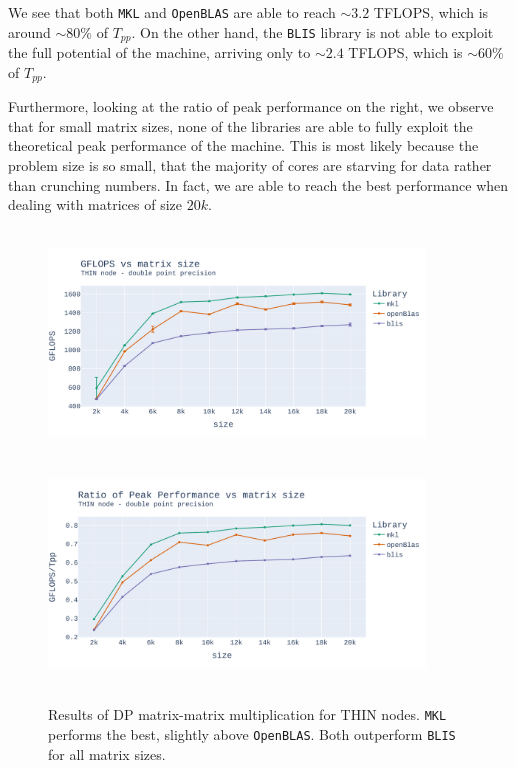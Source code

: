 \documentclass{report}
\begin{document}
We see that both \texttt{MKL} and \texttt{OpenBLAS} are able to reach $\sim 3.2$ 
TFLOPS, which is around $\sim80\%$ of $T_{pp}$. On the other hand, the \texttt{BLIS}
library is not able to exploit the full potential of the machine, arriving only
to $\sim 2.4$ TFLOPS, which is $\sim60\%$ of $T_{pp}$.

Furthermore, looking at the ratio of peak performance on the right, we observe 
that for small matrix sizes, none of the libraries are able to fully exploit 
the theoretical peak performance of the machine. This is most likely because the 
problem size is so small, that the majority of cores are starving for data rather 
than crunching numbers. In fact, we are able to reach the best performance when 
dealing with matrices of size $20k$. 

\begin{figure}[H]
\hspace*{-2.5cm}
\includegraphics[width=10cm, height=6cm]{./images/fixed_cores_thin_double_gflops.pdf}
\includegraphics[width=10cm, height=6cm]{./images/fixed_cores_thin_double_gflops_ratio.pdf}
\caption{\label{fig:fixed_cores_thin_double} Results of DP matrix-matrix multiplication 
for THIN nodes. \texttt{MKL} performs the best, slightly above \texttt{OpenBLAS}. 
Both outperform \texttt{BLIS} for all matrix sizes.}
\end{figure}
\end{document}
